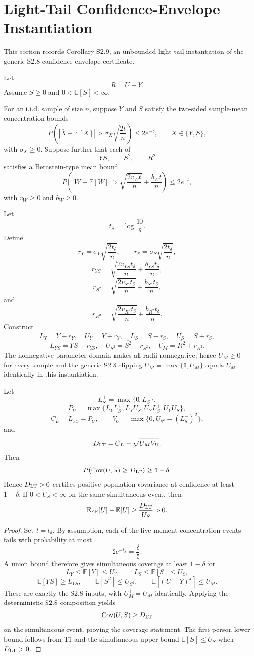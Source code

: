 \section{Light-Tail Confidence-Envelope Instantiation}

This section records Corollary S2.9, an unbounded light-tail instantiation of the generic S2.8 confidence-envelope certificate.

Let
\[
R=U-Y.
\]
Assume $S\ge0$ and $0<\mathbb E[S]<\infty$.

For an i.i.d. sample of size $n$, suppose $Y$ and $S$ satisfy the two-sided sample-mean concentration bounds
\[
P\!\left(
|\bar X-\mathbb E[X]|>
\sigma_X\sqrt{\frac{2t}{n}}
\right)
\le2e^{-t},
\qquad X\in\{Y,S\},
\]
with $\sigma_X\ge0$. Suppose further that each of
\[
YS,\qquad S^2,\qquad R^2
\]
satisfies a Bernstein-type mean bound
\[
P\!\left(
|\bar W-\mathbb E[W]|>
\sqrt{\frac{2v_Wt}{n}}+
\frac{b_Wt}{n}
\right)
\le2e^{-t},
\]
with $v_W\ge0$ and $b_W\ge0$.

\begin{corollary}
Let
\[
t_\delta=\log\frac{10}{\delta}.
\]
Define
\[
r_Y=\sigma_Y\sqrt{\frac{2t_\delta}{n}},
\qquad
r_S=\sigma_S\sqrt{\frac{2t_\delta}{n}},
\]
\[
r_{YS}=\sqrt{\frac{2v_{YS}t_\delta}{n}}+\frac{b_{YS}t_\delta}{n},
\]
\[
r_{S^2}=\sqrt{\frac{2v_{S^2}t_\delta}{n}}+\frac{b_{S^2}t_\delta}{n},
\]
and
\[
r_{R^2}=\sqrt{\frac{2v_{R^2}t_\delta}{n}}+\frac{b_{R^2}t_\delta}{n}.
\]
Construct
\[
L_Y=\bar Y-r_Y,
\quad U_Y=\bar Y+r_Y,
\quad
L_S=\bar S-r_S,
\quad U_S=\bar S+r_S,
\]
\[
L_{YS}=\overline{YS}-r_{YS},
\quad
U_{S^2}=\overline{S^2}+r_{S^2},
\quad
U_M=\overline{R^2}+r_{R^2}.
\]
The nonnegative parameter domain makes all radii nonnegative; hence $U_M\ge0$ for every sample and the generic S2.8 clipping $U_M^+=\max\{0,U_M\}$ equals $U_M$ identically in this instantiation.

Let
\[
L_S^+=\max\{0,L_S\},
\]
\[
P_U=
\max\{L_YL_S^+,L_YU_S,U_YL_S^+,U_YU_S\},
\]
\[
C_L=L_{YS}-P_U,
\qquad
V_U=\max\{0,U_{S^2}-(L_S^+)^2\},
\]
and
\[
D_{\rm LT}=C_L-\sqrt{U_MV_U}.
\]
Then
\[
P\!\left(
\operatorname{Cov}(U,S)\ge D_{\rm LT}
\right)
\ge1-\delta.
\]
Hence $D_{\rm LT}>0$ certifies positive population covariance at confidence at least $1-\delta$. If $0<U_S<\infty$ on the same simultaneous event, then
\[
\mathbb E_{\rm FP}[U]-\mathbb E[U]
\ge
\frac{D_{\rm LT}}{U_S}>0.
\]
\end{corollary}

\begin{proof}
Set $t=t_\delta$. By assumption, each of the five moment-concentration events fails with probability at most
\[
2e^{-t_\delta}=\frac{\delta}{5}.
\]
A union bound therefore gives simultaneous coverage at least $1-\delta$ for
\[
L_Y\le\mathbb E[Y]\le U_Y,
\qquad
L_S\le\mathbb E[S]\le U_S,
\]
\[
\mathbb E[YS]\ge L_{YS},
\qquad
\mathbb E[S^2]\le U_{S^2},
\qquad
\mathbb E[(U-Y)^2]\le U_M.
\]
These are exactly the S2.8 inputs, with $U_M^+=U_M$ identically. Applying the deterministic S2.8 composition yields
\[
\operatorname{Cov}(U,S)
\ge D_{\rm LT}
\]
on the simultaneous event, proving the coverage statement. The first-person lower bound follows from T1 and the simultaneous upper bound $\mathbb E[S]\le U_S$ when $D_{\rm LT}>0$.
\end{proof}

